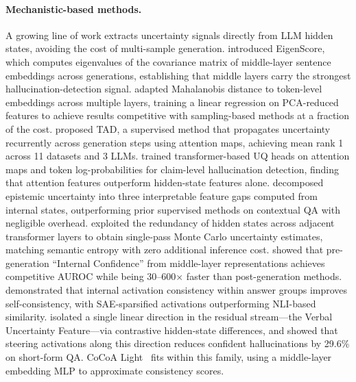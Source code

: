 \paragraph{Mechanistic-based methods.}
A growing line of work extracts uncertainty signals directly from LLM hidden states, avoiding the cost of multi-sample generation.
\citet{chen2024inside} introduced EigenScore, which computes eigenvalues of the covariance matrix of middle-layer sentence embeddings across generations, establishing that middle layers carry the strongest hallucination-detection signal.
\citet{vazhentsev2025satmd} adapted Mahalanobis distance to token-level embeddings across multiple layers, training a linear regression on PCA-reduced features to achieve results competitive with sampling-based methods at a fraction of the cost.
\citet{vazhentsev2025tad} proposed TAD, a supervised method that propagates uncertainty recurrently across generation steps using attention maps, achieving mean rank 1 across 11 datasets and 3 LLMs.
\citet{shelmanov2025uqheads} trained transformer-based UQ heads on attention maps and token log-probabilities for claim-level hallucination detection, finding that attention features outperform hidden-state features alone.
\citet{bakman2026featuregaps} decomposed epistemic uncertainty into three interpretable feature gaps computed from internal states, outperforming prior supervised methods on contextual QA with negligible overhead.
\citet{gao2025flue} exploited the redundancy of hidden states across adjacent transformer layers to obtain single-pass Monte Carlo uncertainty estimates, matching semantic entropy with zero additional inference cost.
\citet{chen2026querylevel} showed that pre-generation ``Internal Confidence'' from middle-layer representations achieves competitive AUROC while being 30--600$\times$ faster than post-generation methods.
\citet{jiang2025rc} demonstrated that internal activation consistency within answer groups improves self-consistency, with SAE-sparsified activations outperforming NLI-based similarity.
\citet{ji2025vuf} isolated a single linear direction in the residual stream---the Verbal Uncertainty Feature---via contrastive hidden-state differences, and showed that steering activations along this direction reduces confident hallucinations by 29.6\% on short-form QA.
CoCoA Light~\citep{cocoa2024} fits within this family, using a middle-layer embedding MLP to approximate consistency scores.


